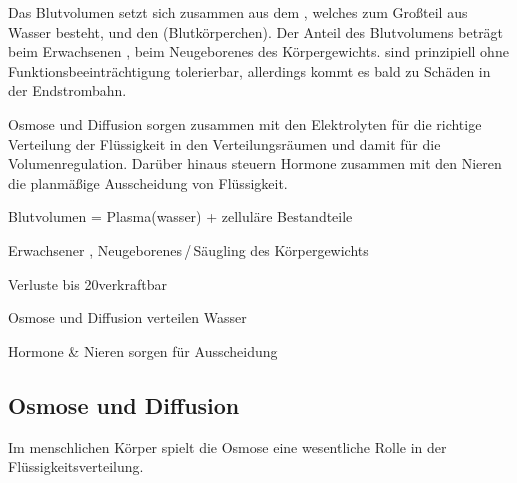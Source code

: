 \documentclass[
ngerman,
paper=a4,
asymmetric,
fontsize=10pt,
draft=false,
numbers=noenddot,
bibtotocnumbered,
footnotes=multiple,
]{scrreprt}
\begin{document}
{%
Das Blutvolumen setzt sich zusammen aus dem ,
welches zum Großteil aus Wasser besteht, und den
 (Blutkörperchen).
Der Anteil des Blutvolumens beträgt beim Erwachsenen
\PC*, beim Neugeborenes \PC* des Körpergewichts.
 sind prinzipiell ohne
Funktionsbeeinträchtigung tolerierbar, allerdings kommt es
bald zu Schäden in der Endstrombahn.

Osmose und Diffusion sorgen zusammen mit den Elektrolyten
für die richtige Verteilung der Flüssigkeit in den
Verteilungsräumen und damit für die Volumenregulation.
Darüber hinaus steuern
Hormone zusammen
mit den Nieren die planmäßige Ausscheidung von Flüssigkeit.
}{
\begin{compactitem}
  \item Blutvolumen = Plasma(wasser) + zelluläre Bestandteile
  \item Erwachsener \PC*, Neugeborenes\,/\,Säugling \PC* des Körpergewichts
  \item Verluste bis 20\PC* verkraftbar
  \item Osmose und Diffusion verteilen Wasser
  \item Hormone {\&} Nieren sorgen für Ausscheidung
\end{compactitem}
}
{}{}{}

\subsection{Osmose und Diffusion}
\label{topic:osmose}
\label{topic:diffusion}
 
{\TxBeschreibung}
{ 
 Im menschlichen Körper spielt die Osmose eine wesentliche
Rolle in der Flüssigkeitsverteilung.}
{}
{}
{}
{}


\end{document}
